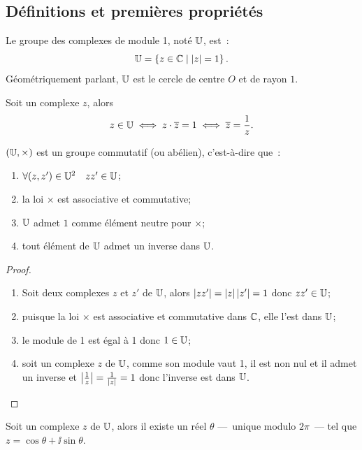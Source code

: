 \subsection{Définitions et premières propriétés}
\label{subsec:groupeU-defetprop}
\begin{defdef}
  Le groupe des complexes de module 1, noté \(\mathbb{U}\), est~:
  \begin{equation}
    \mathbb{U}=\left\{z \in \mathbb{C}\mathrel{}\middle|\mathrel{}\left\lvert z\right\rvert=1\right\}.
  \end{equation}
  Géométriquement parlant, \(\mathbb{U}\) est le cercle de centre \(O\) et de rayon \(1\).
\end{defdef}
%
\begin{prop}
  Soit un complexe \(z\), alors
  \begin{equation}
    z \in \mathbb{U} \iff z \cdot \overline{z}=1 \iff \overline{z}=\frac{1}{z}.
  \end{equation}
\end{prop}
%
\begin{prop}
  \((\mathbb{U}, \times)\) est un groupe commutatif (ou abélien), c'est-à-dire que~:
  \begin{enumerate}
  \item \(\forall (z,z') \in \mathbb{U}^2 \quad zz' \in \mathbb{U}\);
  \item la loi \(\times\) est associative et commutative;
  \item \(\mathbb{U}\) admet \(1\) comme élément neutre pour \(\times\);
  \item tout élément de \(\mathbb{U}\) admet un inverse dans \(\mathbb{U}\).
  \end{enumerate}
\end{prop}
\begin{proof}
  \begin{enumerate}
  \item Soit deux complexes \(z\) et \(z'\) de \(\mathbb{U}\), alors \(\left\lvert zz'\right\rvert=\left\lvert z\right\rvert\left\lvert z'\right\rvert=1\) donc \(zz' \in \mathbb{U}\);
  \item puisque la loi \(\times\) est associative et commutative dans \(\mathbb{C}\), elle l'est dans \(\mathbb{U}\);
  \item le module de 1 est égal à 1 donc \(1 \in \mathbb{U}\);
  \item soit un complexe \(z\) de \(\mathbb{U}\), comme son module vaut 1, il est non nul et il admet un inverse et \(\left\lvert\frac{1}{z}\right\rvert=\frac{1}{\left\lvert z\right\rvert}=1\) donc l'inverse est dans \(\mathbb{U}\).
  \end{enumerate}
\end{proof}
%
\begin{prop}\label{prop:expsurj}
  Soit un complexe \(z\) de \(\mathbb{U}\), alors il existe un réel \(\theta\) ---~unique modulo \(2\pi\)~--- tel que \(z=\cos\theta +\ii\sin\theta\).
\end{prop}
